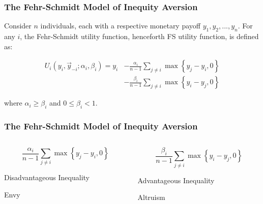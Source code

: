 \documentclass{beamer}
\begin{document}
\begin{frame}
	\frametitle{The Fehr-Schmidt Model of Inequity Aversion}
	
	Consider $n$ individuals, each with a respective monetary payoff $y_1,y_2,...,y_n$. For any $i$, the Fehr-Schmidt utility function, henceforth FS utility function, is defined as:
	
	\begin{equation}
	\begin{split}
	U_i\left(y_i,\vec{y}_{-i};\alpha_i,\beta_i\right) = y_i & -  \frac{\alpha_i}{n-1} \sum_{j\neq i} \max \left \{ y_j - y_i,0 \right \} \\
	& - \frac{\beta_i}{n-1} \sum_{j\neq i} \max \left \{ y_i - y_j,0 \right \}
	\end{split}
	\end{equation}

where $\alpha_i \geq \beta_i$ and $0 \leq \beta_i <1$.

\end{frame}

\begin{frame}
	\frametitle{The Fehr-Schmidt Model of Inequity Aversion}
\begin{columns}
	\begin{column}{0.5\textwidth}
		\begin{equation*}
			\frac{\alpha_i}{n-1} \sum_{j\neq i} \max \left \{ y_j - y_i,0 \right \} 
		\end{equation*}
		\begin{center}
			Disadvantageous Inequality
		\end{center}
		\begin{center}
		Envy
		\end{center}
	\end{column}
	\begin{column}{0.5\textwidth}  %
		\begin{equation*}
\frac{\beta_i}{n-1} \sum_{j\neq i} \max \left \{ y_i - y_j,0 \right \}
\end{equation*}
\begin{center}
	Advantageous Inequality
\end{center}
\begin{center}
	Altruism
\end{center}
	\end{column}
\end{columns}
\end{frame}
\end{document}
